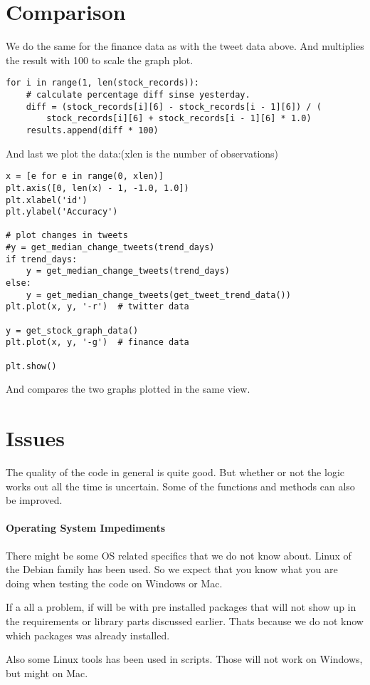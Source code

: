 \section{Comparison}\label{code:comparison}
We do the same for the finance data as with the tweet data above. And multiplies
the result with 100 to scale the graph plot.  
\begin{verbatim}
for i in range(1, len(stock_records)):
    # calculate percentage diff sinse yesterday.
    diff = (stock_records[i][6] - stock_records[i - 1][6]) / (
        stock_records[i][6] + stock_records[i - 1][6] * 1.0)
    results.append(diff * 100)
\end{verbatim}

And last we plot the data:(xlen is the number of observations) 
\begin{verbatim}
x = [e for e in range(0, xlen)]
plt.axis([0, len(x) - 1, -1.0, 1.0])
plt.xlabel('id')
plt.ylabel('Accuracy')

# plot changes in tweets
#y = get_median_change_tweets(trend_days)
if trend_days:
    y = get_median_change_tweets(trend_days)
else:
    y = get_median_change_tweets(get_tweet_trend_data())
plt.plot(x, y, '-r')  # twitter data

y = get_stock_graph_data()
plt.plot(x, y, '-g')  # finance data

plt.show()
\end{verbatim}

And compares the two graphs plotted in the same view. 
%
 
\section{Issues}\label{code:issues}
The  quality of the code in general is quite good. But whether or not the logic
works out all the time is uncertain. Some of the functions and methods can also
be improved.   

\paragraph{Operating System Impediments}
There might be some OS related specifics that we do not know about. Linux of
the Debian family has been used. So we expect that you know what you are doing
when testing the code on Windows or Mac.

If a all a problem, if will be with pre installed packages that will not
show up in the requirements or library parts discussed earlier. Thats because we
do not know which packages was already installed.  

Also some Linux tools has been used in scripts. Those will not work on Windows,
but might on Mac.
